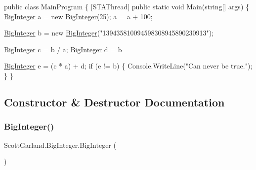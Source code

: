 \begin{DoxyCode}
\textcolor{keyword}{public} \textcolor{keyword}{class }MainProgram
\{
    [STAThread]
    \textcolor{keyword}{public} \textcolor{keyword}{static} \textcolor{keywordtype}{void} Main(\textcolor{keywordtype}{string}[] args)
    \{
        \hyperlink{class_scott_garland_1_1_big_integer_a8255378a9b7d296d78d3bc446f7b3949}{BigInteger} a = \textcolor{keyword}{new} \hyperlink{class_scott_garland_1_1_big_integer_a8255378a9b7d296d78d3bc446f7b3949}{BigInteger}(25);
        a = a + 100;

        \hyperlink{class_scott_garland_1_1_big_integer_a8255378a9b7d296d78d3bc446f7b3949}{BigInteger} b = \textcolor{keyword}{new} \hyperlink{class_scott_garland_1_1_big_integer_a8255378a9b7d296d78d3bc446f7b3949}{BigInteger}(\textcolor{stringliteral}{"139435810094598308945890230913"});

        \hyperlink{class_scott_garland_1_1_big_integer_a8255378a9b7d296d78d3bc446f7b3949}{BigInteger} c = b / a;
        \hyperlink{class_scott_garland_1_1_big_integer_a8255378a9b7d296d78d3bc446f7b3949}{BigInteger} d = b %

        \hyperlink{class_scott_garland_1_1_big_integer_a8255378a9b7d296d78d3bc446f7b3949}{BigInteger} e = (c * a) + d;
        \textcolor{keywordflow}{if} (e != b)
        \{
            Console.WriteLine(\textcolor{stringliteral}{"Can never be true."});
        \}
    \}
\end{DoxyCode}
 

\subsection{Constructor \& Destructor Documentation}
\mbox{\label{class_scott_garland_1_1_big_integer_a8255378a9b7d296d78d3bc446f7b3949}} 
\subsubsection{\texorpdfstring{Big\+Integer()}{BigInteger()}\hspace{0.1cm}{\footnotesize\ttfamily [1/8]}}
{\footnotesize\ttfamily Scott\+Garland.\+Big\+Integer.\+Big\+Integer (\begin{DoxyParamCaption}{ }\end{DoxyParamCaption})\hspace{0.3cm}{\ttfamily [inline]}}



